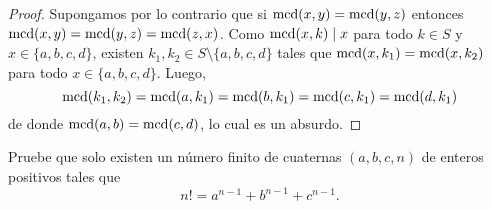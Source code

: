 \begin{proof}
  Supongamos por lo contrario que si $\operatorname{mcd}(x,y)=\operatorname{mcd}(y,z)$ entonces
  $\operatorname{mcd}(x,y)=\operatorname{mcd}(y,z)=\operatorname{mcd}(z,x)$. Como $\operatorname{mcd}(x,k)\mid x$ para todo $k\in S$ y
  $x\in\{a,b,c,d\}$, existen $k_1,k_2\in S\setminus\{a,b,c,d\}$ tales que
  $\operatorname{mcd}(x,k_1)=\operatorname{mcd}(x,k_2)$ para todo $x\in\{a,b,c,d\}$. Luego,
  \[\operatorname{mcd}(k_1,k_2)=\operatorname{mcd}(a,k_1)=\operatorname{mcd}(b,k_1)=\operatorname{mcd}(c,k_1)=\operatorname{mcd}(d,k_1)\]
  de donde $\operatorname{mcd}(a,b)=\operatorname{mcd}(c,d)$, lo cual es un absurdo.
\end{proof}

\begin{probMB}
  Pruebe que solo existen un número finito de cuaternas $(a,b,c,n)$ de enteros
  positivos tales que
  \[n!=a^{n-1}+b^{n-1}+c^{n-1}.\]
\end{probMB}

